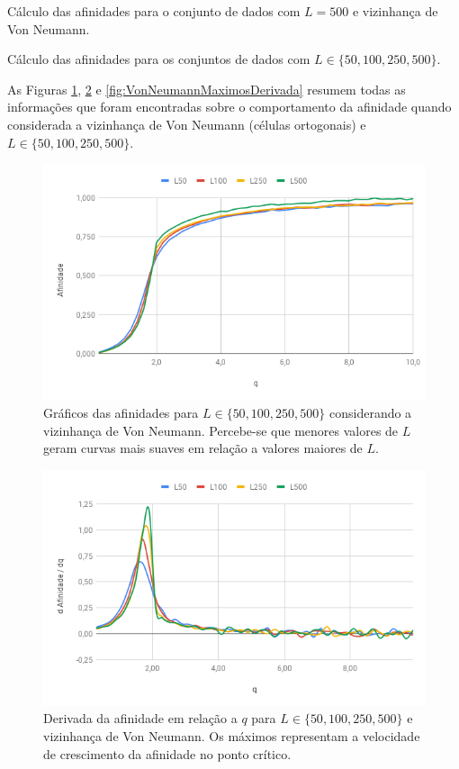 \documentclass[12pt,a4paper,final]{article}
\begin{document}
  Cálculo das afinidades para o conjunto de dados com $L=500$ e vizinhança de Von Neumann. 
  
  Cálculo das afinidades para os conjuntos de dados com $L\in\{50, 100, 250, 500\}$.

  As Figuras \ref{fig:VonNeumannAfinidades}, \ref{fig:VonNeumannDerivadaAfinidade} e \ref{fig:VonNeumannMaximosDerivada} resumem todas as informações que foram encontradas sobre o comportamento da afinidade quando considerada a vizinhança de Von Neumann (células ortogonais) e $L\in\{50, 100, 250, 500\}$.

  \begin{figure}[h]
    \centering
    \includegraphics[width=.7\linewidth]{VonNeumannAfinidades.png}
    \caption{Gráficos das afinidades para $L\in\{50, 100, 250, 500\}$ considerando a vizinhança de Von Neumann. Percebe-se que menores valores de $L$ geram curvas mais suaves em relação a valores maiores de $L$.}
    \label{fig:VonNeumannAfinidades}
  \end{figure}

  \begin{figure}[h]
    \centering
    \includegraphics[width=.7\linewidth]{VonNeumannDerivadaAfinidade.png}
    \caption{Derivada da afinidade em relação a $q$ para $L\in\{50, 100, 250, 500\}$ e vizinhança de Von Neumann. Os máximos representam a velocidade de crescimento da afinidade no ponto crítico.}
    \label{fig:VonNeumannDerivadaAfinidade}
  \end{figure}
\end{document}
